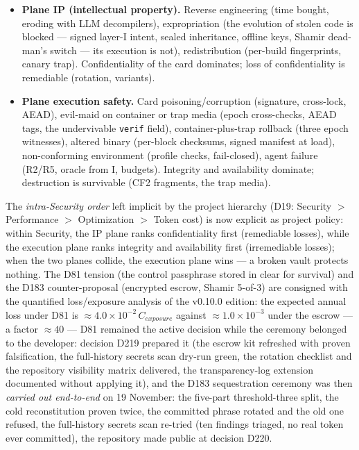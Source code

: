 \documentclass[11pt,a4paper]{article}
\newcommand{\code}[1]{\texttt{\small #1}}
\begin{document}
\begin{itemize}
\item \textbf{Plane IP (intellectual property).} Reverse engineering
(time bought, eroding with LLM decompilers), expropriation (the
evolution of stolen code is blocked --- signed layer-I intent, sealed
inheritance, offline keys, Shamir dead-man's switch --- its execution
is not), redistribution (per-build fingerprints, canary trap).
Confidentiality of the card dominates; loss of confidentiality is
remediable (rotation, variants).
\item \textbf{Plane execution safety.} Card poisoning/corruption
(signature, cross-lock, AEAD), evil-maid on container or trap media
(epoch cross-checks, AEAD tags, the undervivable \code{verif} field),
container-plus-trap rollback (three epoch witnesses), altered binary
(per-block checksums, signed manifest at load), non-conforming
environment (profile checks, fail-closed), agent failure (R2/R5,
oracle from I, budgets). Integrity and availability dominate;
destruction is survivable (CF2 fragments, the trap media).
\end{itemize}

The \emph{intra-Security order} left implicit by the project hierarchy
(D19: Security $>$ Performance $>$ Optimization $>$ Token cost) is now
explicit as project policy: within Security, the IP plane ranks
confidentiality first (remediable losses), while the execution plane
ranks integrity and availability first (irremediable losses); when the
two planes collide, the execution plane wins --- a broken vault protects
nothing. The D81 tension (the control passphrase stored in clear for
survival) and the D183 counter-proposal (encrypted escrow, Shamir
5-of-3) are consigned with the quantified loss/exposure analysis of the
v0.10.0 edition: the expected annual loss under D81 is
$\approx 4.0 \times 10^{-2}\,C_{exposure}$ against
$\approx 1.0 \times 10^{-3}$ under the escrow --- a factor $\approx 40$
--- D81 remained the active decision while the ceremony belonged to
the developer: decision D219 prepared it (the escrow kit refreshed
with proven falsification, the full-history secrets scan dry-run
green, the rotation checklist and the repository visibility matrix
delivered, the transparency-log extension documented without applying
it), and the D183 sequestration ceremony was then \emph{carried out
end-to-end} on 19 November: the five-part threshold-three split, the
cold reconstitution proven twice, the committed phrase rotated and the
old one refused, the full-history secrets scan re-tried (ten findings
triaged, no real token ever committed), the repository made public at
decision D220.
\end{document}
